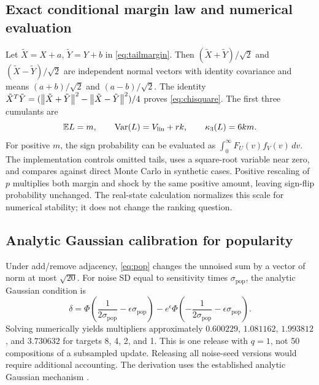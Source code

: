 \subsection{Exact conditional margin law and numerical evaluation}
Let $\tilde X=X+a$, $\tilde Y=Y+b$ in \cref{eq:tailmargin}. Then
$(\tilde X+\tilde Y)/\sqrt2$ and $(\tilde X-\tilde Y)/\sqrt2$ are independent
normal vectors with identity covariance and means $(a+b)/\sqrt2$ and
$(a-b)/\sqrt2$. The identity
$\tilde X^T\tilde Y=(\left\lVert \tilde X+\tilde Y\right\rVert^2-
\left\lVert \tilde X-\tilde Y\right\rVert^2)/4$ proves \cref{eq:chisquare}. The first
three cumulants are
\begin{equation}
 \mathbb{E} L=m,\qquad \operatorname{Var}(L)=V_{\mathrm{lin}}+rk,
 \qquad \kappa_3(L)=6km.
\end{equation}
For positive $m$, the sign probability can be evaluated as
$\int_0^\infty F_U(v)f_V(v)\,dv$. The implementation controls omitted
tails, uses a square-root variable near zero, and compares against direct
Monte Carlo in synthetic cases. Positive rescaling of $p$ multiplies both
margin and shock by the same positive amount, leaving sign-flip probability
unchanged. The real-state calculation normalizes this scale for numerical
stability; it does not change the ranking question.

\subsection{Analytic Gaussian calibration for popularity}
Under add/remove adjacency, \cref{eq:pop} changes the unnoised sum by a
vector of norm at most $\sqrt{20}$. For noise SD equal to sensitivity times
$\sigma_{\mathrm{pop}}$, the analytic Gaussian condition is
\begin{equation}
 \delta=\Phi\left(\frac{1}{2\sigma_{\mathrm{pop}}}
                           -\epsilon\sigma_{\mathrm{pop}}\right)
 -e^\epsilon\Phi\left(-\frac{1}{2\sigma_{\mathrm{pop}}}
                           -\epsilon\sigma_{\mathrm{pop}}\right).
\end{equation}
Solving numerically yields multipliers approximately $0.600229$, $1.081162$,
$1.993812$, and $3.730632$ for targets 8, 4, 2, and 1. This is one release
with $q=1$, not 50 compositions of a subsampled update. Releasing all
noise-seed versions would require additional accounting. The derivation
uses the established analytic Gaussian mechanism \citep{balle2018gaussian}.
